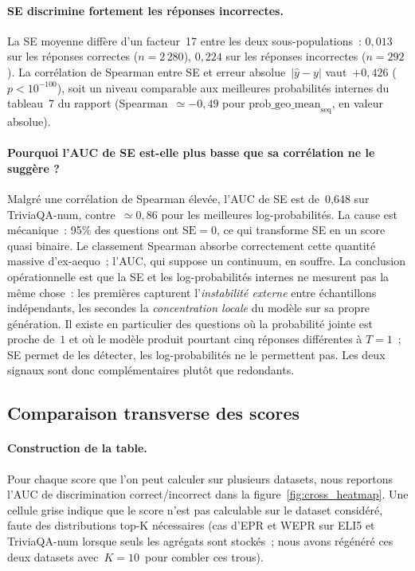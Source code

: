 \paragraph{SE discrimine fortement les réponses incorrectes.}
La SE moyenne diffère d'un facteur~17 entre les deux sous-populations~:
$0{,}013$ sur les réponses correctes ($n = 2\,280$), $0{,}224$ sur les
réponses incorrectes ($n = 292$). La corrélation de Spearman entre SE
et erreur absolue~$|\hat{y}-y|$ vaut~$+0{,}426$ ($p < 10^{-100}$),
soit un niveau comparable aux meilleures probabilités internes du
tableau~7 du rapport (Spearman~$\simeq -0{,}49$ pour
$\mathrm{prob\_geo\_mean}_{\mathrm{seq}}$, en valeur absolue).

\paragraph{Pourquoi l'AUC de SE est-elle plus basse que sa corrélation
ne le suggère ?}
Malgré une corrélation de Spearman élevée, l'AUC de SE est de~0{,}648
sur TriviaQA-num, contre~$\simeq 0{,}86$ pour les meilleures
log-probabilités. La cause est mécanique~: 95\% des questions ont
$\mathrm{SE} = 0$, ce qui transforme SE en un score quasi binaire. Le
classement Spearman absorbe correctement cette quantité massive
d'ex-aequo~; l'AUC, qui suppose un continuum, en souffre. La conclusion
opérationnelle est que la SE et les log-probabilités internes ne
mesurent pas la même chose~: les premières capturent l'\emph{instabilité
externe} entre échantillons indépendants, les secondes la
\emph{concentration locale} du modèle sur sa propre génération. Il
existe en particulier des questions où la probabilité jointe est
proche de~$1$ et où le modèle produit pourtant cinq réponses
différentes à $T=1$~; SE permet de les détecter, les log-probabilités
ne le permettent pas. Les deux signaux sont donc complémentaires
plutôt que redondants.

\subsection{Comparaison transverse des scores}
\label{sec:cross_table}

\paragraph{Construction de la table.}
Pour chaque score que l'on peut calculer sur plusieurs datasets, nous
reportons l'AUC de discrimination correct/incorrect dans la
figure~\ref{fig:cross_heatmap}. Une cellule grise indique que le score
n'est pas calculable sur le dataset considéré, faute des
distributions top-K nécessaires (cas d'EPR et WEPR sur ELI5
et TriviaQA-num lorsque seuls les agrégats sont stockés~; nous avons
régénéré ces deux datasets avec~$K=10$~pour combler ces trous).


